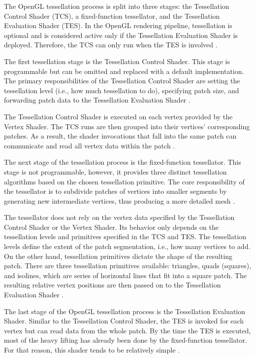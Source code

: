 \documentclass[
  digital,     %
  oneside,     %
  nosansbold,  %
  nocolorbold, %
  lof,         %
  lot,         %
]{fithesis4}
\begin{document}
The OpenGL tessellation process is split into three stages: the Tessellation Control Shader (TCS), a
fixed-function tessellator, and the Tessellation Evaluation Shader (TES). In the OpenGL rendering
pipeline, tessellation is optional and is considered active only if the Tessellation Evaluation Shader is
deployed. Therefore, the TCS can only run when the TES is involved \cite{openglwiki-tessellation}.

The first tessellation stage is the Tessellation Control Shader. This stage is programmable but can be
omitted and replaced with a default implementation. The primary responsibilities of the Tessellation
Control Shader are setting the tessellation level (i.e., how much tessellation to do), specifying patch
size, and forwarding patch data to the Tessellation Evaluation Shader \cite{openglwiki-tcs}.

The Tessellation Control Shader is executed on each vertex provided by the Vertex Shader. The TCS
runs are then grouped into their vertices' corresponding patches. As a result, the shader invocations
that fall into the same patch can communicate and read all vertex data within the patch \cite{openglwiki-tcs}.

The next stage of the tessellation process is the fixed-function tessellator. This stage is not
programmable, however, it provides three distinct tessellation algorithms based on the chosen
tessellation primitive. The core responsibility of the tessellator is to subdivide patches of vertices
into smaller segments by generating new intermediate vertices, thus producing a more detailed
mesh \cite{openglwiki-tessellation}.

The tessellator does not rely on the vertex data specified by the Tessellation Control Shader or the
Vertex Shader. Its behavior only depends on the tessellation levels and primitives specified in the
TCS and TES. The tessellation levels define the extent of the patch segmentation, i.e.,
how many vertices to add. On the other hand, tessellation primitives dictate the shape of the
resulting patch. There are three tessellation primitives available: triangles, quads (squares), and
isolines, which are series of horizontal lines that fit into a square patch. The resulting relative vertex
positions are then passed on to the Tessellation Evaluation Shader \cite{openglwiki-tessellation}.

The last stage of the OpenGL tessellation process is the Tessellation Evaluation Shader. Similar to the
Tessellation Control Shader, the TES is invoked for each vertex but can read data from the whole
patch. By the time the TES is executed, most of the heavy lifting has already been done by the fixed-function tessellator. For that reason, this shader tends to be relatively simple \cite{openglwiki-tessellation}.
\end{document}
